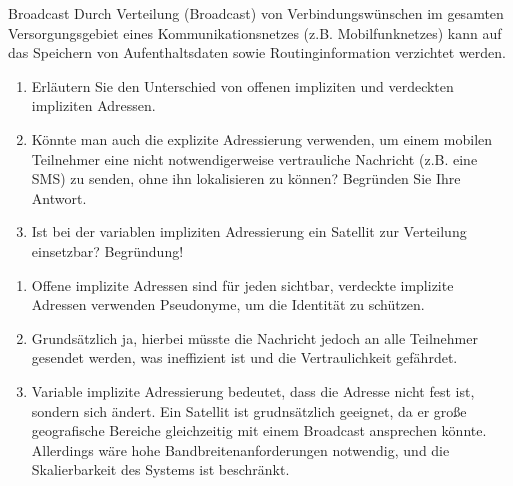 \documentclass{article}
\begin{document}
\setcounter{subsection}{2229}
\begin{exercise}{Broadcast}
  Durch Verteilung (Broadcast) von Verbindungswünschen im gesamten Versorgungsgebiet eines Kommunikationsnetzes (z.B. Mobilfunknetzes) kann auf das Speichern von Aufenthaltsdaten sowie Routinginformation verzichtet werden.
  \begin{enumerate}
    \item Erläutern Sie den Unterschied von offenen impliziten und verdeckten impliziten Adressen.
    \item Könnte man auch die explizite Adressierung verwenden, um einem mobilen Teilnehmer eine nicht notwendigerweise vertrauliche Nachricht (z.B. eine SMS) zu senden, ohne ihn lokalisieren zu können? Begründen Sie Ihre Antwort.
    \item Ist bei der variablen impliziten Adressierung ein Satellit zur Verteilung einsetzbar? Begründung!
  \end{enumerate}

  \begin{solution}
    \begin{enumerate}
      \item Offene implizite Adressen sind für jeden sichtbar, verdeckte implizite Adressen verwenden Pseudonyme, um die Identität zu schützen.
      \item Grundsätzlich ja, hierbei müsste die Nachricht jedoch an alle Teilnehmer gesendet werden, was ineffizient ist und die Vertraulichkeit gefährdet.
      \item Variable implizite Adressierung bedeutet, dass die Adresse nicht fest ist, sondern sich ändert. Ein Satellit ist grudnsätzlich geeignet, da er große geografische Bereiche gleichzeitig mit einem Broadcast ansprechen könnte. Allerdings wäre hohe Bandbreitenanforderungen notwendig, und die Skalierbarkeit des Systems ist beschränkt.
    \end{enumerate}
  \end{solution}
\end{exercise}
\end{document}
